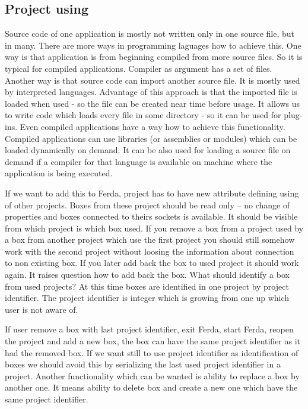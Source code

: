 \documentclass[a4paper,12pt]{book}
\begin{document}
\subsection{Project using}
Source code of one application is mostly not written only in one source file, but in many. There are more ways in programming laguages how to achieve this. One way is that application is from beginning compiled from more source files. So it is typical for compiled applications. Compiler as argument has a set of files. Another way is that source code can import another source file. It is mostly used by interpreted languages. Advantage of this approach is that the imported file is loaded when used - so the file can be created near time before usage. It allows us to write code which loads every file in some directory - so it can be used for plug-ins. Even compiled applications have a way how to achieve this functionality. Compiled applications can use libraries (or assemblies or modules) which can be loaded dynamically on demand. It can be also used for loading a source file on demand if a compiler for that language is available on machine where the application is being executed.

If we want to add this to Ferda, project has to have new attribute defining using of other projects. Boxes from these project should be read only -- no change of properties and boxes connected to theirs sockets is available. It should be visible from which project is which box used. If you remove a box from a project used by a box from another project which use the first project you should still somehow work with the second project without loosing the information about connection to non existing box. If you later add back the box to used project it should work again. It raises question how to add back the box. What should identify a box from used projects? At this time boxes are identified in one project by project identifier. The project identifier is integer which is growing from one up which user is not aware of.

If user remove a box with last project identifier, exit Ferda, start Ferda, reopen the project and add a new box, the box can have the same project identifier as it had the removed box. If we want still to use project identifier as identification of boxes we should avoid this by serializing the last used project identifier in a project. Another functionality which can be wanted is ability to replace a box by another one. It means ability to delete box and create a new one which have the same project identifier.
\end{document}
